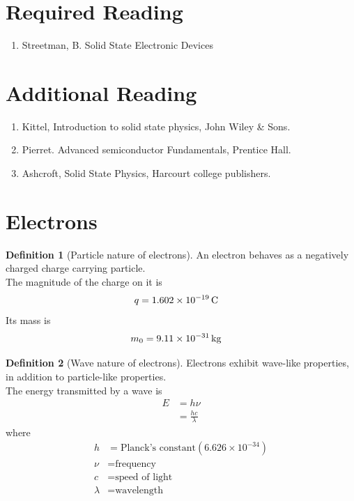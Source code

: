 \documentclass[titlepage, fleqn, a4paper, 12pt, twoside]{article}
\theoremstyle{definition}
\newtheorem{definition}{Definition}
\theoremstyle{theorem}
\let\Oldsection\section
\renewcommand{\section}{\FloatBarrier\Oldsection}
\begin{document}
\section{Required Reading}

\begin{enumerate}
	\item Streetman, B. Solid State Electronic Devices
\end{enumerate}

\section{Additional Reading}

\begin{enumerate}
	\item Kittel, Introduction to solid state physics, John Wiley \& Sons.
	\item Pierret. Advanced semiconductor Fundamentals, Prentice Hall.
	\item Ashcroft, Solid State Physics, Harcourt college publishers.
\end{enumerate}

\newpage
\section{Electrons}

\begin{definition}[Particle nature of electrons]
	An electron behaves as a negatively charged charge carrying particle.\\
	The magnitude of the charge on it is
	\begin{align*}
		q & = 1.602 \times 10^{-19} \coulomb
	\end{align*}
	Its mass is
	\begin{align*}
		m_0 & = 9.11 \times 10^{-31} \kilogram
	\end{align*}
\end{definition}

\begin{definition}[Wave nature of electrons]
	Electrons exhibit wave-like properties, in addition to particle-like properties.\\
	The energy transmitted by a wave is
	\begin{align*}
		E & = h \nu \\
                  & = \frac{h c}{\lambda}
	\end{align*}
	where
	\begin{align*}
		h       & = \text{Planck's constant} \left( 6.626 \times 10^{-34} \right) \\
		\nu     & = \text{frequency}                                              \\
		c       & = \text{speed of light}                                         \\
		\lambda & = \text{wavelength}
	\end{align*}
\end{definition}
\end{document}
